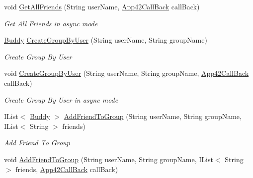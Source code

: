 \begin{DoxyCompactItemize}
void \hyperlink{classcom_1_1shephertz_1_1app42_1_1paas_1_1sdk_1_1csharp_1_1buddy_1_1_buddy_service_aacb368a741699c2c193967c18aa7e0bf}{Get\+All\+Friends} (String user\+Name, \hyperlink{interfacecom_1_1shephertz_1_1app42_1_1paas_1_1sdk_1_1csharp_1_1_app42_call_back}{App42\+Call\+Back} call\+Back)
\begin{DoxyCompactList}\small\item\em Get All Friends in async mode \end{DoxyCompactList}\item 
\hyperlink{classcom_1_1shephertz_1_1app42_1_1paas_1_1sdk_1_1csharp_1_1buddy_1_1_buddy}{Buddy} \hyperlink{classcom_1_1shephertz_1_1app42_1_1paas_1_1sdk_1_1csharp_1_1buddy_1_1_buddy_service_a69b6c23235623f91fe814074488db480}{Create\+Group\+By\+User} (String user\+Name, String group\+Name)
\begin{DoxyCompactList}\small\item\em Create Group By User \end{DoxyCompactList}\item 
void \hyperlink{classcom_1_1shephertz_1_1app42_1_1paas_1_1sdk_1_1csharp_1_1buddy_1_1_buddy_service_a04e4f9e3063a27d2cde5bd898d2b9624}{Create\+Group\+By\+User} (String user\+Name, String group\+Name, \hyperlink{interfacecom_1_1shephertz_1_1app42_1_1paas_1_1sdk_1_1csharp_1_1_app42_call_back}{App42\+Call\+Back} call\+Back)
\begin{DoxyCompactList}\small\item\em Create Group By User in async mode \end{DoxyCompactList}\item 
I\+List$<$ \hyperlink{classcom_1_1shephertz_1_1app42_1_1paas_1_1sdk_1_1csharp_1_1buddy_1_1_buddy}{Buddy} $>$ \hyperlink{classcom_1_1shephertz_1_1app42_1_1paas_1_1sdk_1_1csharp_1_1buddy_1_1_buddy_service_abbe05303995b5d6d158282936f8a2fb7}{Add\+Friend\+To\+Group} (String user\+Name, String group\+Name, I\+List$<$ String $>$ friends)
\begin{DoxyCompactList}\small\item\em Add Friend To Group \end{DoxyCompactList}\item 
void \hyperlink{classcom_1_1shephertz_1_1app42_1_1paas_1_1sdk_1_1csharp_1_1buddy_1_1_buddy_service_a7cc281ef7f208f8b6a774d58f34ea7e5}{Add\+Friend\+To\+Group} (String user\+Name, String group\+Name, I\+List$<$ String $>$ friends, \hyperlink{interfacecom_1_1shephertz_1_1app42_1_1paas_1_1sdk_1_1csharp_1_1_app42_call_back}{App42\+Call\+Back} call\+Back)

\end{DoxyCompactItemize}
